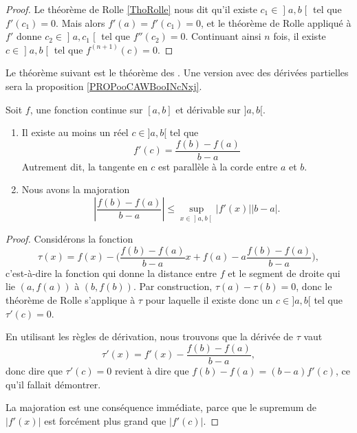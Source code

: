 \begin{proof}
	Le théorème de Rolle \ref{ThoRolle} nous dit qu'il existe \( c_1\in \mathopen] a , b \mathclose[\) tel que \( f'(c_1)=0\). Mais alors \( f'(a)=f'(c_1)=0\), et le théorème de Rolle appliqué à \( f'\) donne \( c_2\in \mathopen] a , c_1 \mathclose[\) tel que \( f''(c_2)=0\). Continuant ainsi \( n\) fois, il existe \( c\in \mathopen] a ,b\mathclose[\) tel que \( f^{(n+1)}(c)=0\).
\end{proof}

Le théorème suivant est le théorème des . Une version avec des dérivées partielles sera la proposition \ref{PROPooCAWBooINcNxj}.
\begin{theorem}       \label{ThoAccFinis}
	Soit \( f\), une fonction continue sur \( [a,b]\) et dérivable sur \( ]a,b[\).
	\begin{enumerate}
		\item       \label{ITEMooFZONooXJqLyX}
		      Il existe au moins un réel \( c\in]a,b[\) tel que
		      \begin{equation}
			      f'(c)=\frac{ f(b)-f(a) }{ b-a }
		      \end{equation}
		      Autrement dit, la tangente en \( c\) est parallèle à la corde entre \( a\) et \( b\).
		\item       \label{ITEMooXRQKooDBFpdQ}
		      Nous avons la majoration
		      \begin{equation}
			      \left| \frac{ f(b)-f(a) }{ b-a } \right| \leq \sup_{x\in\mathopen] a , b \mathclose[}| f'(x) |  | b-a |.
		      \end{equation}
	\end{enumerate}
\end{theorem}

\begin{proof}
	Considérons la fonction
	\begin{equation}
		\tau(x)=f(x)-\Big( \frac{ f(b)-f(a) }{ b-a }x + f(a) - a\frac{ f(b)-f(a) }{ b-a } \Big),
	\end{equation}
	c'est-à-dire la fonction qui donne la distance entre \( f\) et le segment de droite qui lie \( (a,f(a))\) à \( (b,f(b))\). Par construction, \( \tau(a)-\tau(b)=0\), donc le théorème de Rolle s'applique à \( \tau\) pour laquelle il existe donc un \( c\in]a,b[\) tel que \( \tau'(c)=0\).

	En utilisant les règles de dérivation, nous trouvons que la dérivée de \( \tau\) vaut
	\begin{equation}
		\tau'(x)= f'(x)-\frac{ f(b)-f(a) }{ b-a },
	\end{equation}
	donc dire que \( \tau'(c)=0\) revient à dire que \( f(b)-f(a)=(b-a)f'(c)\), ce qu'il fallait démontrer.

	La majoration est une conséquence immédiate, parce que le supremum de \( | f'(x) |\) est forcément plus grand que \( | f'(c) |\).
\end{proof}

